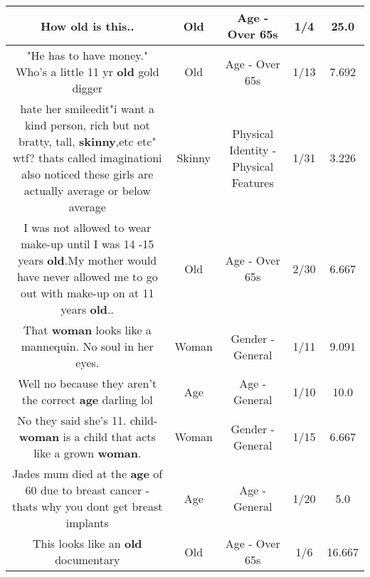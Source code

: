\documentclass[11pt]{article}
\newlength\mylength
\begin{document}
\begin{center}
\begin{longtable}{|C{.65\mylength}|C{.30\mylength}|C{.12\mylength}|C{.12\mylength}|C{.12\mylength}|}
  \small How \textbf{old} is this..\normalsize   & Old & Age - Over 65s & 1/4 & 25.0 \\  \hline
  \small "He has to have money." Who's a little 11 yr \textbf{old} gold digger\normalsize   & Old & Age - Over 65s & 1/13 & 7.692 \\  \hline
  \small hate her smileedit"i want a kind person, rich but not bratty, tall, \textbf{skinny},etc etc" wtf? thats called imaginationi also noticed these girls are actually average or below average\normalsize   & Skinny & Physical Identity - Physical Features & 1/31 & 3.226 \\  \hline
  \small I was not allowed to wear make-up until I was 14 -15 years \textbf{old}.My mother would have never allowed me to go out with make-up on at 11 years \textbf{old}..\normalsize   & Old & Age - Over 65s & 2/30 & 6.667 \\  \hline
  \small That \textbf{woman} looks like a mannequin. No soul in her eyes.\normalsize   & Woman & Gender - General & 1/11 & 9.091 \\  \hline
  \small Well no because they aren't the correct \textbf{age} darling lol\normalsize   & Age & Age - General & 1/10 & 10.0 \\  \hline
  \small No they said she's 11. child-\textbf{woman} is a child that acts like a grown \textbf{woman}.\normalsize   & Woman & Gender - General & 1/15 & 6.667 \\  \hline
  \small Jades mum died at the \textbf{age} of 60 due to breast cancer - thats why you dont get breast implants\normalsize   & Age & Age - General & 1/20 & 5.0 \\  \hline
  \small This looks like an \textbf{old} documentary\normalsize   & Old & Age - Over 65s & 1/6 & 16.667 \\  \hline

\end{longtable}
\end{center}
\end{document}
